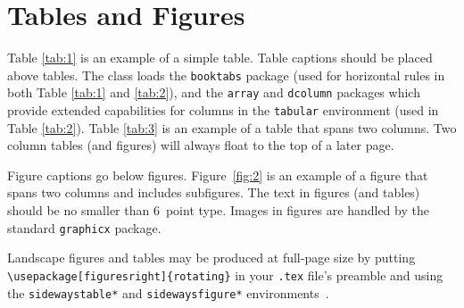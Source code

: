 \documentclass[varvw,largesc,upint,mathalfa=cal=euler,hyphenate,balance,lang-second=french,lang=english,colorlinks]{asmeconf} %
\begin{document}
\begin{table}[t]
\caption{Table with more complicated columns}\label{tab:2}%
\end{table}


\section{Tables and Figures}

Table \ref{tab:1} is an example of a simple table. Table captions should be placed above tables.
The class loads the \texttt{booktabs} package (used for horizontal rules in both Table \ref{tab:1} and \ref{tab:2}), and the \texttt{array} and \texttt{dcolumn} packages which provide extended capabilities for columns in the \texttt{tabular} environment (used in Table \ref{tab:2}).  Table \ref{tab:3} is an example of a table that spans two columns. Two column tables (and figures) will always float to the top of a later page.

Figure captions go below figures. Figure~\ref{fig:2} is an example of a figure that spans two columns and includes subfigures. The text in figures (and tables) should be no smaller than 6~point type. Images in figures are handled by the standard \texttt{graphicx} package.

Landscape figures and tables may be produced at full-page size by putting \verb|\usepackage[figuresright]{rotating}| in your \texttt{.tex} file's preamble and using the \texttt{sidewaystable*} and \texttt{sidewaysfigure*} environments~\cite{fairbairns}.
\end{document}
